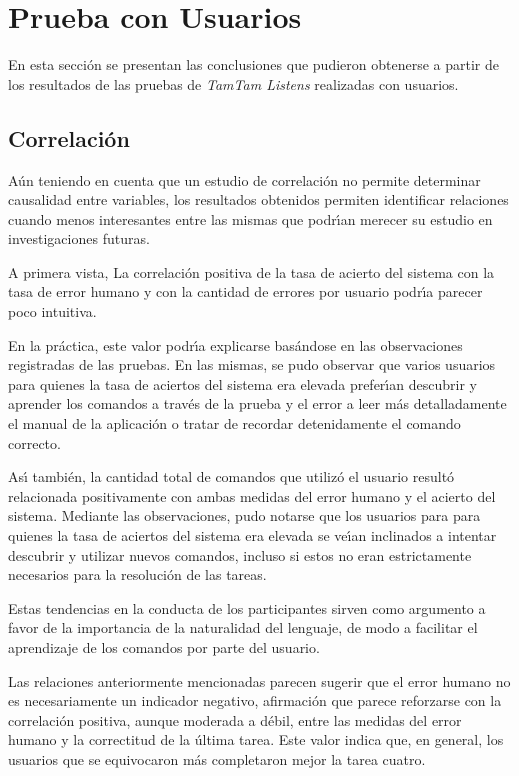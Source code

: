 \section{Prueba con Usuarios}
\label{sec:prueba}

En esta secci\'on se presentan las conclusiones que pudieron obtenerse a partir de los
resultados de las pruebas de \emph{TamTam Listens} realizadas con usuarios.

\subsection{Correlaci\'on}
A\'un teniendo en cuenta que un estudio de correlaci\'on no permite determinar causalidad
entre variables, los resultados obtenidos permiten identificar relaciones cuando menos
interesantes entre las mismas que podr{\'\i}an merecer su estudio en investigaciones futuras.

A primera vista, La correlaci\'on positiva de la tasa de acierto del sistema con la
tasa de error humano y con la cantidad de errores por usuario podr{\'\i}a parecer
poco intuitiva.

En la pr\'actica, este valor podr{\'\i}a explicarse bas\'andose en las observaciones registradas 
de las pruebas. En las mismas, se pudo observar que varios usuarios para quienes la tasa de
aciertos del sistema era elevada prefer{\'\i}an descubrir y aprender los comandos a trav\'es
de la prueba y el error a leer m\'as detalladamente el manual de la aplicaci\'on o tratar de
recordar detenidamente el comando correcto.

As{\'\i} tambi\'en, la cantidad total de comandos que utiliz\'o el usuario result\'o relacionada
positivamente con ambas medidas del error humano y el acierto del sistema. Mediante las 
observaciones, pudo notarse que los usuarios para para quienes la tasa de
aciertos del sistema era elevada se ve{\'\i}an inclinados a intentar descubrir y utilizar nuevos
comandos, incluso si estos no eran estrictamente necesarios para la resoluci\'on de las tareas.

Estas tendencias en la conducta de los participantes sirven como argumento a favor de la importancia 
de la naturalidad del lenguaje, de modo a facilitar el aprendizaje de los comandos por parte del usuario.

Las relaciones anteriormente mencionadas parecen sugerir que el error humano no es necesariamente
un indicador negativo, afirmaci\'on que parece reforzarse con la correlaci\'on positiva, aunque moderada
a d\'ebil, entre las medidas del error humano y la correctitud de la \'ultima tarea. Este valor
indica que, en general, los usuarios que se equivocaron m\'as completaron mejor la tarea cuatro.

